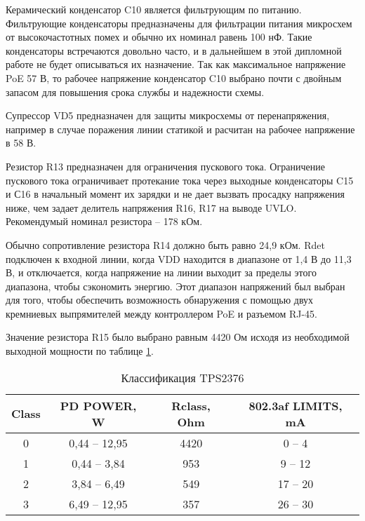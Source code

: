 Керамический конденсатор C10 является фильтрующим по питанию. Фильтрующие конденсаторы предназначены 
для фильтрации питания микросхем от высокочастотных помех и обычно их номинал равень 100 нФ.
Такие конденсаторы встречаются довольно  часто, и в дальнейшем в этой дипломной работе не будет 
описываться их назначение. Так как максимальное напряжение PoE 57 В, то рабочее напряжение 
конденсатор C10 выбрано почти с двойным запасом для повышения срока службы и надежности схемы.

Супрессор VD5 предназначен для защиты микросхемы от перенапряжения, например в случае поражения
линии статикой и расчитан на рабочее напряжение в 58 В. 

Резистор R13 предназначен для ограничения пускового тока. Ограничение пускового тока ограничивает
протекание тока через выходные конденсаторы C15 и С16 в начальный момент их зарядки и не дает 
вызвать просадку напряжения ниже, чем задает делитель напряжения R16, R17 на выводе UVLO. 
Рекомендумый номинал резистора -- 178 кОм.  

Обычно сопротивление резистора R14 должно быть равно 24,9 кОм. Rdet подключен к входной линии, 
когда VDD находится в диапазоне от 1,4 В до 11,3 В, и отключается,
когда напряжение на линии выходит за пределы этого диапазона, чтобы сэкономить энергию.
Этот диапазон напряжений был выбран для того, чтобы обеспечить возможность обнаружения с 
помощью двух кремниевых выпрямителей между контроллером PoE и разъемом RJ-45.

Значение резистора R15 было выбрано равным 4420 Ом исходя из 
необходимой выходной мощности по таблице \ref{ClassTPS2376}.

\begin{table}[H]
    \caption{Классификация TPS2376} 
    \label{ClassTPS2376}
    \begin{center}
    \begin{tabular}{|c|c|c|c|}
    \hline
    Class & PD POWER, W  &  Rclass, Ohm   & 802.3af LIMITS, mA \\ \hline
    0 & 0,44 -- 12,95  & 4420 &0 -- 4  \\ \hline
    1 & 0,44 -- 3,84 & 953 & 9 -- 12   \\ \hline
    2 & 3,84 -- 6,49 & 549 & 17 -- 20  \\ \hline
    3 & 6,49 -- 12,95 & 357 & 26 -- 30   \\ \hline
    \end{tabular}
    \end{center}
\end{table} 

